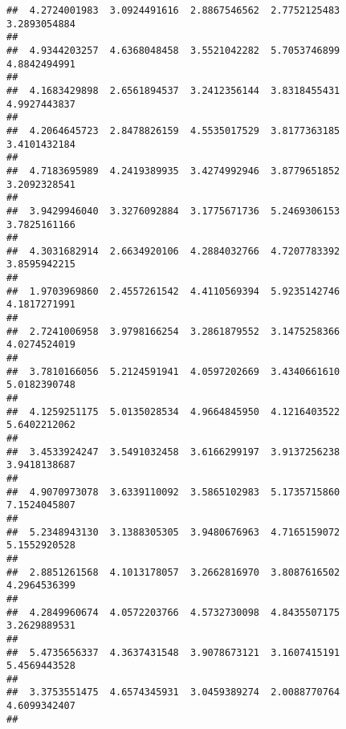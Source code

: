 \documentclass[]{article}
\begin{document}
\begin{verbatim}
##  4.2724001983  3.0924491616  2.8867546562  2.7752125483  3.2893054884 
##                                                                       
##  4.9344203257  4.6368048458  3.5521042282  5.7053746899  4.8842494991 
##                                                                       
##  4.1683429898  2.6561894537  3.2412356144  3.8318455431  4.9927443837 
##                                                                       
##  4.2064645723  2.8478826159  4.5535017529  3.8177363185  3.4101432184 
##                                                                       
##  4.7183695989  4.2419389935  3.4274992946  3.8779651852  3.2092328541 
##                                                                       
##  3.9429946040  3.3276092884  3.1775671736  5.2469306153  3.7825161166 
##                                                                       
##  4.3031682914  2.6634920106  4.2884032766  4.7207783392  3.8595942215 
##                                                                       
##  1.9703969860  2.4557261542  4.4110569394  5.9235142746  4.1817271991 
##                                                                       
##  2.7241006958  3.9798166254  3.2861879552  3.1475258366  4.0274524019 
##                                                                       
##  3.7810166056  5.2124591941  4.0597202669  3.4340661610  5.0182390748 
##                                                                       
##  4.1259251175  5.0135028534  4.9664845950  4.1216403522  5.6402212062 
##                                                                       
##  3.4533924247  3.5491032458  3.6166299197  3.9137256238  3.9418138687 
##                                                                       
##  4.9070973078  3.6339110092  3.5865102983  5.1735715860  7.1524045807 
##                                                                       
##  5.2348943130  3.1388305305  3.9480676963  4.7165159072  5.1552920528 
##                                                                       
##  2.8851261568  4.1013178057  3.2662816970  3.8087616502  4.2964536399 
##                                                                       
##  4.2849960674  4.0572203766  4.5732730098  4.8435507175  3.2629889531 
##                                                                       
##  5.4735656337  4.3637431548  3.9078673121  3.1607415191  5.4569443528 
##                                                                       
##  3.3753551475  4.6574345931  3.0459389274  2.0088770764  4.6099342407 
##                                                                       

\end{verbatim}
\end{document}
